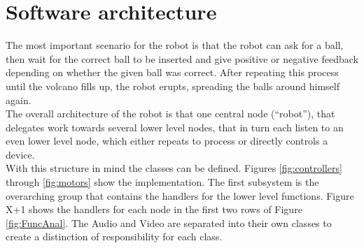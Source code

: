 \documentclass[11pt,twoside,a4paper]{report}
\begin{document}
\section{Software architecture}
The most important scenario for the robot is that the robot can ask for a ball, then wait for the correct ball to be inserted and give positive or negative feedback depending on whether the given ball was correct. After repeating this process until the volcano fills up, the robot erupts, spreading the balls around himself again. \\
The overall architecture of the robot is that one central node (“robot”), that delegates work towards several lower level nodes, that in turn each listen to an even lower level node, which either repeats to process or directly controls a device. \\
With this structure in mind the classes can be defined. Figures \ref{fig:controllers} through \ref{fig:motors} show the implementation. The first subsystem is the overarching group that contains the handlers for the lower level functions. Figure X+1 shows the handlers for each node in the first two rows of Figure \ref{fig:FuncAnal}. The Audio and Video are separated into their own classes to create a distinction of responsibility for each class. 
\end{document}
